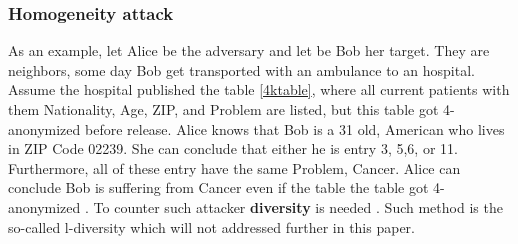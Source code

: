 \documentclass{llncs}
\begin{document}
\subsubsection{Homogeneity attack}

As an example, let Alice be the adversary and let be Bob her target. They are neighbors, some day Bob get transported with an ambulance to an hospital. Assume the hospital published the table \ref{4ktable}, where all current patients with them Nationality, Age, ZIP, and Problem are listed, but this table got 4-anonymized before release. Alice knows that Bob is a 31 old, American who lives in ZIP Code 02239. She can conclude that either he is entry 3, 5,6, or 11. Furthermore, all of these entry have the same Problem, Cancer. Alice can conclude Bob is suffering from Cancer even if the table the table got 4-anonymized \cite{sweeney2002k,ldiversity}. To counter such attacker \textbf{diversity} is needed \cite{ldiversity}. Such method is the so-called l-diversity which will not addressed further in this paper.  
\end{document}
